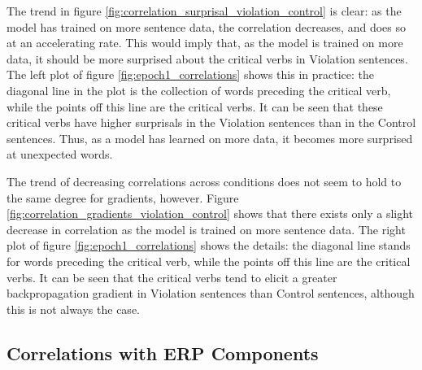 \documentclass{IEEEtran}
\begin{document}
The trend in figure \ref{fig:correlation_surprisal_violation_control} is clear: as the model has trained on more sentence data, the correlation decreases, and does so at an accelerating rate.
This would imply that, as the model is trained on more data, it should be more surprised about the critical verbs in Violation sentences.
The left plot of figure \ref{fig:epoch1_correlations} shows this in practice: the diagonal line in the plot is the collection of words preceding the critical verb, while the points off this line are the critical verbs.
It can be seen that these critical verbs have higher surprisals in the Violation sentences than in the Control sentences.
Thus, as a model has learned on more data, it becomes more surprised at unexpected words.

The trend of decreasing correlations across conditions does not seem to hold to the same degree for gradients, however.
Figure \ref{fig:correlation_gradients_violation_control} shows that there exists only a slight decrease in correlation as the model is trained on more sentence data.
The right plot of figure \ref{fig:epoch1_correlations} shows the details: the diagonal line stands for words preceding the critical verb, while the points off this line are the critical verbs.
It can be seen that the critical verbs tend to elicit a greater backpropagation gradient in Violation sentences than Control sentences, although this is not always the case.

\subsection{Correlations with ERP Components}

\end{document}
